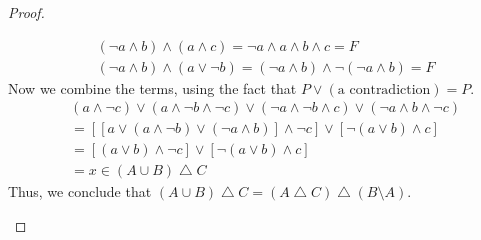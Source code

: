 \documentclass[12pt]{amsart}
\theoremstyle{definition}
\theoremstyle{remark}
\begin{document}
\begin{proof}
\begin{enumerate}
\begin{align*}
		& (\neg a \wedge b) \wedge (a \wedge c) = \neg a \wedge a \wedge b \wedge c = F \\
		& (\neg a \wedge b) \wedge (a \vee \neg b) 
			= (\neg a \wedge b) \wedge \neg (\neg a \wedge b) = F
	\end{align*}
	Now we combine the terms, using the fact that $P \vee (\text{a contradiction}) = P$.
	\begin{align*}
		& (a \wedge \neg c) \vee (a \wedge \neg b \wedge \neg c)
			\vee (\neg a \wedge \neg b \wedge c) \vee (\neg a \wedge b \wedge \neg c) \\
		&= [[a \vee (a \wedge \neg b) \vee (\neg a \wedge b)] \wedge \neg c]
			\vee [\neg (a \vee b) \wedge c] \\
		&= [(a \vee b) \wedge \neg c] \vee [\neg (a \vee b) \wedge c] \\
		&= x \in (A \cup B) \bigtriangleup C
	\end{align*}
	Thus, we conclude that $(A \cup B) \bigtriangleup C = (A \bigtriangleup C) \bigtriangleup (B \setminus A)$.
	

\end{enumerate}
\end{proof}
\end{document}
